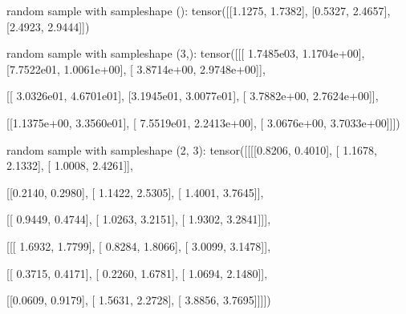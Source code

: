 \documentclass[letterpaper,10pt,english]{sphinxmanual}
\begin{document}
\begin{sphinxVerbatim}[commandchars=\\\{\}]
random sample with sample\PYGZus{}shape ():
 tensor([[1.1275, 1.7382],
        [0.5327, 2.4657],
        [2.4923, 2.9444]]) 

random sample with sample\PYGZus{}shape (3,):
 tensor([[[ 1.7485e\PYGZhy{}03,  1.1704e+00],
         [\PYGZhy{}7.7522e\PYGZhy{}01,  1.0061e+00],
         [ 3.8714e+00,  2.9748e+00]],

        [[ 3.0326e\PYGZhy{}01,  4.6701e\PYGZhy{}01],
         [\PYGZhy{}3.1945e\PYGZhy{}01,  3.0077e\PYGZhy{}01],
         [ 3.7882e+00,  2.7624e+00]],

        [[\PYGZhy{}1.1375e+00,  3.3560e\PYGZhy{}01],
         [ 7.5519e\PYGZhy{}01,  2.2413e+00],
         [ 3.0676e+00,  3.7033e+00]]]) 

random sample with sample\PYGZus{}shape (2, 3):
 tensor([[[[\PYGZhy{}0.8206,  0.4010],
          [ 1.1678,  2.1332],
          [ 1.0008,  2.4261]],

         [[\PYGZhy{}0.2140, \PYGZhy{}0.2980],
          [ 1.1422,  2.5305],
          [ 1.4001,  3.7645]],

         [[ 0.9449,  0.4744],
          [ 1.0263,  3.2151],
          [ 1.9302,  3.2841]]],


        [[[ 1.6932,  1.7799],
          [ 0.8284,  1.8066],
          [ 3.0099,  3.1478]],

         [[ 0.3715,  0.4171],
          [ 0.2260,  1.6781],
          [ 1.0694,  2.1480]],

         [[\PYGZhy{}0.0609,  0.9179],
          [ 1.5631,  2.2728],
          [ 3.8856,  3.7695]]]])
\end{sphinxVerbatim}

\begin{sphinxVerbatim}[commandchars=\\\{\}]
  \PYG{p}{[}\PYG{p}{]}
  \PYG{p}{[}\PYG{p}{]}
  
  
\end{sphinxVerbatim}
\end{document}
